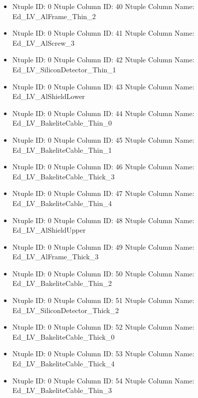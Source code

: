 \documentclass[8pt]{beamer}
\begin{document}
\begin{frame}
\begin{itemize}
        \item Ntuple ID: 0 Ntuple Column ID: 40 Ntuple Column Name: Ed\_LV\_AlFrame\_Thin\_2
        
        \item Ntuple ID: 0 Ntuple Column ID: 41 Ntuple Column Name: Ed\_LV\_AlScrew\_3
        
        \item Ntuple ID: 0 Ntuple Column ID: 42 Ntuple Column Name: Ed\_LV\_SiliconDetector\_Thin\_1
        
        \item Ntuple ID: 0 Ntuple Column ID: 43 Ntuple Column Name: Ed\_LV\_AlShieldLower
        
        \item Ntuple ID: 0 Ntuple Column ID: 44 Ntuple Column Name: Ed\_LV\_BakeliteCable\_Thin\_0
        
        \item Ntuple ID: 0 Ntuple Column ID: 45 Ntuple Column Name: Ed\_LV\_BakeliteCable\_Thin\_1
        
        \item Ntuple ID: 0 Ntuple Column ID: 46 Ntuple Column Name: Ed\_LV\_BakeliteCable\_Thick\_3
        
        \item Ntuple ID: 0 Ntuple Column ID: 47 Ntuple Column Name: Ed\_LV\_BakeliteCable\_Thin\_4
        
        \item Ntuple ID: 0 Ntuple Column ID: 48 Ntuple Column Name: Ed\_LV\_AlShieldUpper
        
        \item Ntuple ID: 0 Ntuple Column ID: 49 Ntuple Column Name: Ed\_LV\_AlFrame\_Thick\_3
        
        \item Ntuple ID: 0 Ntuple Column ID: 50 Ntuple Column Name: Ed\_LV\_BakeliteCable\_Thin\_2
        
        \item Ntuple ID: 0 Ntuple Column ID: 51 Ntuple Column Name: Ed\_LV\_SiliconDetector\_Thick\_2
        
        \item Ntuple ID: 0 Ntuple Column ID: 52 Ntuple Column Name: Ed\_LV\_BakeliteCable\_Thick\_0
        
        \item Ntuple ID: 0 Ntuple Column ID: 53 Ntuple Column Name: Ed\_LV\_BakeliteCable\_Thick\_4
        
        \item Ntuple ID: 0 Ntuple Column ID: 54 Ntuple Column Name: Ed\_LV\_BakeliteCable\_Thin\_3
        

\end{itemize}
\end{frame}
\end{document}
